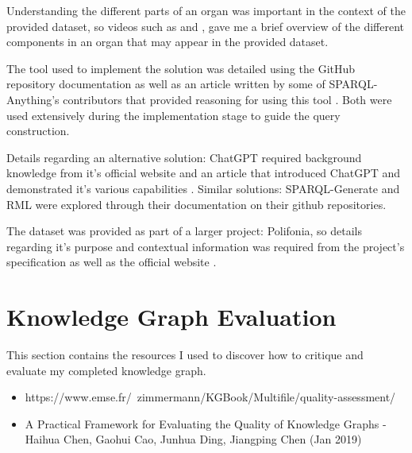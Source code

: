 Understanding the different parts of an organ was important in the context of the provided dataset, so videos such as \cite{organvideo} and \cite{organvideo1}, gave me a brief overview of the different components in an organ that may appear in the provided dataset. 

The tool used to implement the solution was detailed using the GitHub repository documentation \cite{sparqlanythinggithub} as well as an article written by some of SPARQL-Anything's contributors that provided reasoning for using this tool \cite{sparqlanything}. Both were used extensively during the implementation stage to guide the query construction. 

Details regarding an alternative solution: ChatGPT required background knowledge from it's official website \cite{chatgptwebsite} and an article that introduced ChatGPT and demonstrated it's various capabilities \cite{chatgpt}. Similar solutions: SPARQL-Generate \cite{sparqlgenerate} and RML \cite{rml} were explored through their documentation on their github repositories.

The dataset was provided as part of a larger project: Polifonia, so details regarding it's purpose and contextual information was required from the project's specification \cite{polifoniaproject} as well as the official website \cite{polifonia}. 

\section{Knowledge Graph Evaluation}
\hspace{0.5cm} This section contains the resources I used to discover how to critique and evaluate my completed knowledge graph. 
\begin{itemize}
\item https://www.emse.fr/~zimmermann/KGBook/Multifile/quality-assessment/
\item A Practical Framework for Evaluating the Quality of Knowledge Graphs - Haihua Chen, Gaohui Cao, Junhua Ding, Jiangping Chen (Jan 2019)
\end{itemize}

